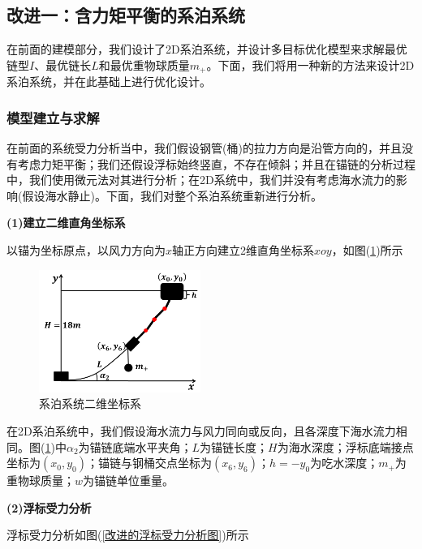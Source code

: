     \subsection{改进一：含力矩平衡的系泊系统}
        \par
        在前面的建模部分，我们设计了2D系泊系统，并设计多目标优化模型来求解最优链型$I$、最优链长$L$和最优重物球质量$m_+$。下面，我们将用一种新的方法来设计2D系泊系统，并在此基础上进行优化设计。
        \subsubsection{模型建立与求解}
            \par
            在前面的系统受力分析当中，我们假设钢管(桶)的拉力方向是沿管方向的，并且没有考虑力矩平衡；我们还假设浮标始终竖直，不存在倾斜；并且在锚链的分析过程中，我们使用微元法对其进行分析；在2D系统中，我们并没有考虑海水流力的影响(假设海水静止)。下面，我们对整个系泊系统重新进行分析。
            \par
            \textbf{(1)建立二维直角坐标系}
            \par
            以锚为坐标原点，以风力方向为$x$轴正方向建立2维直角坐标系$xoy$，如图(\ref{系泊系统二维坐标系})所示
           \begin{figure}[H]
           \centering
           \includegraphics[height=4cm]{images/xiposystem_2_axis.jpg}
           \caption{系泊系统二维坐标系}
           \label{系泊系统二维坐标系}
           \end{figure}
            在2D系泊系统中，我们假设海水流力与风力同向或反向，且各深度下海水流力相同。图(\ref{系泊系统二维坐标系})中$\alpha_2$为锚链底端水平夹角；$L$为锚链长度；$H$为海水深度；浮标底端接点坐标为$(x_0,y_0)$；锚链与钢桶交点坐标为$(x_6,y_6)$；$h = -y_0$为吃水深度；$m_+$为重物球质量；$w$为锚链单位重量。
            \par
            \textbf{(2)浮标受力分析}
            \par
            浮标受力分析如图(\ref{改进的浮标受力分析图})所示
